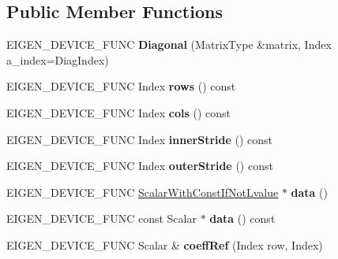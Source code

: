 \subsection*{Public Member Functions}
\begin{DoxyCompactItemize}
\item 
\mbox{\label{class_eigen_1_1_diagonal_a2d836a09e8fa6f29a565b401e7237aac}} 
E\+I\+G\+E\+N\+\_\+\+D\+E\+V\+I\+C\+E\+\_\+\+F\+U\+NC {\bfseries Diagonal} (Matrix\+Type \&matrix, Index a\+\_\+index=Diag\+Index)
\item 
\mbox{\label{class_eigen_1_1_diagonal_a549e6b58fd0cd4e10308584b0508b6bc}} 
E\+I\+G\+E\+N\+\_\+\+D\+E\+V\+I\+C\+E\+\_\+\+F\+U\+NC Index {\bfseries rows} () const
\item 
\mbox{\label{class_eigen_1_1_diagonal_ab11b5031dd773d5e4068a08459f5adc2}} 
E\+I\+G\+E\+N\+\_\+\+D\+E\+V\+I\+C\+E\+\_\+\+F\+U\+NC Index {\bfseries cols} () const
\item 
\mbox{\label{class_eigen_1_1_diagonal_a3c794d393ab816674ebb8551342c351f}} 
E\+I\+G\+E\+N\+\_\+\+D\+E\+V\+I\+C\+E\+\_\+\+F\+U\+NC Index {\bfseries inner\+Stride} () const
\item 
\mbox{\label{class_eigen_1_1_diagonal_a4fb9b9e12eac3a958f82c87034415a48}} 
E\+I\+G\+E\+N\+\_\+\+D\+E\+V\+I\+C\+E\+\_\+\+F\+U\+NC Index {\bfseries outer\+Stride} () const
\item 
\mbox{\label{class_eigen_1_1_diagonal_a76c5ab2b6200a8eb4c73c5e1a17a71fc}} 
E\+I\+G\+E\+N\+\_\+\+D\+E\+V\+I\+C\+E\+\_\+\+F\+U\+NC \mbox{\hyperlink{struct_eigen_1_1internal_1_1true__type}{Scalar\+With\+Const\+If\+Not\+Lvalue}} $\ast$ {\bfseries data} ()
\item 
\mbox{\label{class_eigen_1_1_diagonal_ab60100b4026bd5464034c1d9cb142f8f}} 
E\+I\+G\+E\+N\+\_\+\+D\+E\+V\+I\+C\+E\+\_\+\+F\+U\+NC const Scalar $\ast$ {\bfseries data} () const
\item 
\mbox{\label{class_eigen_1_1_diagonal_ad519faaf574ca09668bf3c400abf392d}} 
E\+I\+G\+E\+N\+\_\+\+D\+E\+V\+I\+C\+E\+\_\+\+F\+U\+NC Scalar \& {\bfseries coeff\+Ref} (Index row, Index)

\end{DoxyCompactItemize}
